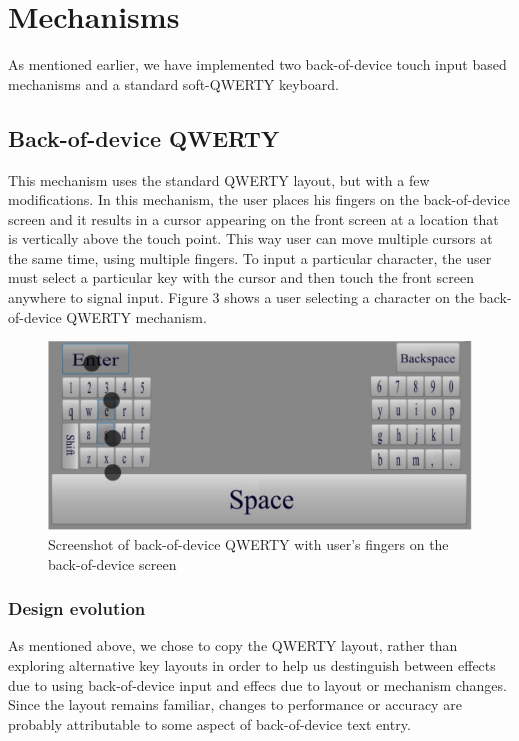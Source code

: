 \section{Mechanisms}

As mentioned earlier, we have implemented two back-of-device touch input based mechanisms and a standard soft-QWERTY keyboard. 

\subsection{Back-of-device QWERTY}

This mechanism uses the standard QWERTY layout, but with a few
modifications. In this mechanism, the user places his fingers on the
back-of-device screen and it results in a cursor appearing on the front
screen at a location that is vertically above the touch point. This
way user can move multiple cursors at the same time, using multiple
fingers. To input a particular character, the user must select a
particular key with the cursor and then touch the front screen
anywhere to signal input. Figure 3 shows a user selecting a character
on the back-of-device QWERTY mechanism.

\begin{figure}
    \includegraphics[scale=0.45]{Figures/backside.pdf} 
    \caption{Screenshot of back-of-device QWERTY with user's fingers on the
      back-of-device screen}
\end{figure}

\subsubsection{Design evolution}

As mentioned above, we chose to copy the QWERTY layout, rather than
exploring alternative key layouts in order to help us destinguish
between effects due to using back-of-device input and effecs due to
layout or mechanism changes.  Since the layout remains familiar,
changes to performance or accuracy are probably attributable to some
aspect of back-of-device text entry.

